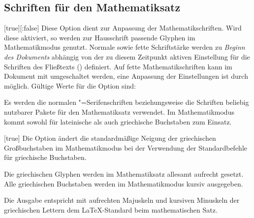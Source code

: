 \begin{Declaration*}{}
\begin{Declaration*}{}
\begin{Declaration*}{}
\subsection{Schriften für den Mathematiksatz}
%
%
%
\begin{Declaration}[v2.03]{}%
  [true][:false]
\printdeclarationlist%
%
Diese Option dient zur Anpassung der Mathematikschriften. Wird diese aktiviert, 
so werden zur Hausschrift passende Glyphen im Mathematikmodus genutzt. Normale 
sowie fette Schriftstärke werden zu \emph{Beginn des Dokuments} abhängig von 
der zu diesem Zeitpunkt aktiven Einstellung für die Schriften des Fließtexts 
() definiert. Auf fette Mathematikschriften kann im 
Dokument mit  umgeschaltet werden, eine Anpassung der 
Einstellungen ist durch  möglich. Gültige Werte für die 
Option  sind:
%
\begin{values}{}
\itemfalse
  Es werden die normalen "=Serifenschriften beziehungsweise die 
  Schriften beliebig nutzbarer Pakete für den Mathematiksatz verwendet.
\itemtrue*
  Im Mathematikmodus kommt \OpenSans sowohl für lateinische als auch 
  griechische Buchstaben zum Einsatz.
\end{values}
\end{Declaration}

\begin{Declaration}[%
  v2.06!\Option{slantedgreek=standard};
]{}[true]
\printdeclarationlist%
%
%
Die Option ändert die standardmäßige Neigung der griechischen Großbuchstaben im 
Mathematikmodus bei der Verwendung der Standardbefehle für griechische 
Buchstaben.
%
\begin{values}{}
\itemfalse
  Die griechischen Glyphen werden im Mathematiksatz allesamt aufrecht gesetzt.
\itemtrue*
  Alle griechischen Buchstaben werden im Mathematikmodus kursiv ausgegeben.
\item[standard/latex]
  Die Ausgabe entspricht mit aufrechten Majuskeln und kursiven Minuskeln der 
  griechischen Lettern dem \LaTeX-Standard beim mathematischen Satz.
\end{values}
\end{Declaration}


\end{Declaration*}
\end{Declaration*}
\end{Declaration*}
